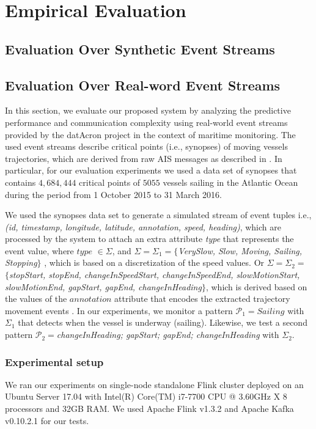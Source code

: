 \chapter{Empirical Evaluation}

\label{chapter:evaluation}

\section{Evaluation Over Synthetic Event Streams}

\section{Evaluation Over Real-word Event Streams}
\label{sec:results}
In this section, we evaluate our proposed system by analyzing the predictive performance and communication complexity  using real-world event streams provided by the datAcron project in the context of maritime monitoring. The used event streams describe critical points (i.e., synopses) of moving vessels trajectories, which are derived from raw AIS messages as described in \cite{synopses1}. In particular, for our evaluation experiments we used a data set of synopses that contains $4,684,444$ critical points of $5055$ vessels sailing in the Atlantic Ocean during the period from 1 October 2015 to 31 March 2016.

\par We used the synopses data set to generate a simulated stream of event tuples  i.e., \textit{(id, timestamp, longitude, latitude, annotation, speed, heading)}, which are processed by the system to attach an extra attribute \textit{type} that represents the event value,  where $type$ $\in \Sigma$,  and $ \Sigma= \Sigma_1=$$\{$\textit{VerySlow, Slow, Moving,  Sailing, Stopping}$\}$ , which is based on a discretization of the speed values. Or $\Sigma=\Sigma_2=$ $\{$\textit{stopStart, stopEnd, changeInSpeedStart, changeInSpeedEnd,  slowMotionStart, slowMotionEnd, gapStart, gapEnd, changeInHeading}$\}$, which is derived based on the values of the $annotation$ attribute that encodes the extracted trajectory movement events \cite{synopses1}. In our experiments, we monitor a pattern $\mathcal{P}_1=Sailing$ with $\Sigma_1$ that detects when the vessel is underway (sailing). Likewise, we test a second pattern  $\mathcal{P}_2=$\textit{changeInHeading; gapStart; gapEnd; changeInHeading} with $\Sigma_2$.


\subsection*{Experimental setup} We ran our experiments on single-node standalone Flink cluster deployed on an Ubuntu Server 17.04 with Intel(R) Core(TM) i7-7700 CPU @ 3.60GHz X 8 processors and 32GB RAM. We used Apache Flink v1.3.2 and Apache Kafka v0.10.2.1 for our tests.


